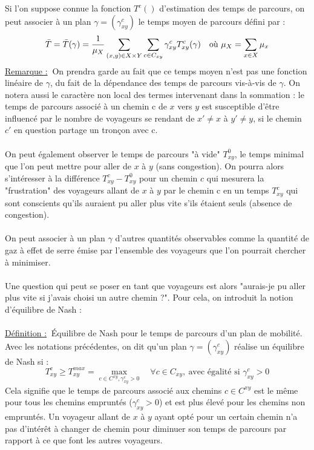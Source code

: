 \documentclass[12pt]{article}
\newcommand{\defin}{\underline{Définition :}}
\newcommand{\rmq}{\underline{Remarque :}}
\begin{document}
Si l'on suppose connue la fonction $T^c()$ d'estimation des temps de parcours, on peut associer à un plan $\gamma = (\gamma^c_{xy})$ le temps moyen de parcours défini par :
\[
\Bar{T} = \Bar{T}(\gamma) = \frac{1}{\mu_X} \sum_{(x,y) \in X \times Y} \sum_{c \in C_{xy}} \gamma^c_{xy}T^c_{xy}(\gamma) \quad \text{où } \mu_X = \sum_{x \in X} \mu_x
\]
\rmq $\:$ On prendra garde au fait que ce temps moyen n’est pas une fonction linéaire de $\gamma$, du fait de la dépendance des temps de parcours vis-à-vis de $\gamma$. On notera aussi le caractère non local des termes intervenant dans la sommation : le temps de parcours associé à un chemin c de $x$ vers $y$ est susceptible d’être
influencé par le nombre de voyageurs se rendant de $x' \neq x$ à $y' \neq y$, si le chemin $c'$ en question partage un
tronçon avec c.\\
\\
On peut également observer le temps de parcours "à vide" $T^0_{xy}$, le temps minimal que l'on peut mettre pour aller de $x$ à $y$ (sans congestion). On pourra alors s'intéresser à la différence $T^c_{xy} - T^0_{xy}$ pour un chemin $c$ qui mesurera la "frustration" des voyageurs allant de $x$ à $y$ par le chemin c en un temps $T^c_{xy}$ qui sont conscients qu'ils auraient pu aller plus vite s'ils étaient seuls (absence de congestion).\\
\\
On peut associer à un plan $\gamma$ d'autres quantités observables comme la quantité de gaz à effet de serre émise par l'ensemble des voyageurs que l'on pourrait chercher à minimiser.\\
\\
Une question qui peut se poser en tant que voyageurs est alors "aurais-je pu aller plus vite si j'avais choisi un autre chemin ?". Pour cela, on introduit la notion d'équilibre de Nash :\\
\\
\defin $\:$ Équilibre de Nash pour le temps de parcours d'un plan de mobilité.\\
Avec les notations précédentes, on dit qu'un plan $\gamma = (\gamma^c_{xy})$ réalise un équilibre de Nash si :\[
T^c_{xy} \geq T^{max}_{xy} = \max_{c \in C^{xy}, \gamma^c_{xy} > 0} \quad \forall c \in C_{xy}, \: \text{avec égalité si } \gamma^c_{xy} > 0
\]
Cela signifie que le temps de parcours associé aux chemins $c \in C^{xy}$ est le même pour tous les chemins empruntés ($\gamma^c_{xy} > 0$) et est plus élevé pour les chemins non empruntés. Un voyageur allant de $x$ à $y$ ayant opté pour un certain chemin n'a pas d'intérêt à changer de chemin pour diminuer son temps de parcours par rapport à ce que font les autres voyageurs.\\
\end{document}
